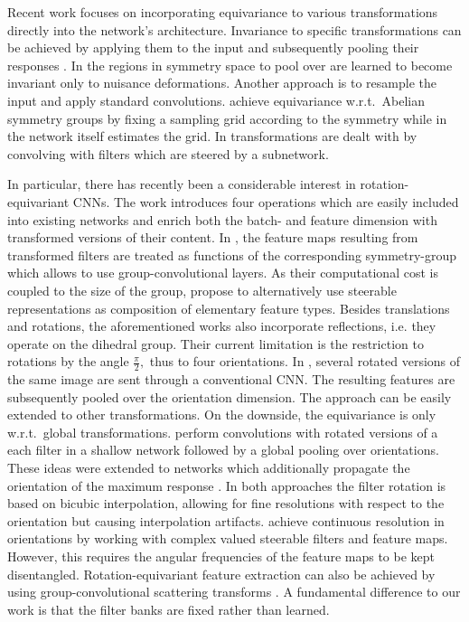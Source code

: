 \documentclass[10pt,twocolumn,letterpaper]{article}
\begin{document}
Recent work focuses on incorporating equivariance to various transformations directly into the network's architecture.
Invariance to specific transformations can be achieved by applying them to the input and subsequently pooling their responses \cite{ICML2012Sohn_659, DBLP:journals/corr/KanazawaSJ14, zhang2015discriminative}.
In \cite{NIPS2014_5424} the regions in symmetry space to pool over are learned to become invariant only to nuisance deformations.
Another approach is to resample the input and apply standard convolutions.
\citet{pmlr-v70-henriques17a} achieve equivariance w.r.t.~Abelian symmetry groups by fixing a sampling grid according to the symmetry while in \cite{DBLP:journals/corr/JaderbergSZK15,lin2016inverse} the network itself estimates the grid.
In \cite{jacobsen2017dynamic} transformations are dealt with by convolving with filters which are steered by a subnetwork.

In particular, there has recently been a considerable interest in rotation-equivariant \mbox{CNNs}.
The work \cite{dieleman2016exploiting} introduces four operations which are easily included into existing networks and enrich both the batch- and feature dimension with transformed versions of their content. 
In \cite{cohen2016group}, the feature maps resulting from transformed filters are treated as functions of the corresponding symmetry-group which allows to use group-convolutional layers.
As their computational cost is coupled to the size of the group, \citet{cohen2016steerable} propose to alternatively use steerable representations as composition of elementary feature types.
Besides translations and rotations, the aforementioned works also incorporate reflections, i.e. they operate on the dihedral group.
Their current limitation is the restriction to rotations by the angle $\frac{\pi}{2},$ thus to four orientations.
In \cite{laptev2016ti}, several rotated versions of the same image are sent through a conventional CNN. The resulting features are subsequently pooled over the orientation dimension.
The approach can be easily extended to other transformations.
On the downside, the equivariance is only w.r.t.~global transformations.
\citet{marcos2016learning} perform convolutions with rotated versions of a each filter in a shallow network followed by a global pooling over orientations.
These ideas were extended to networks which additionally propagate the orientation of the maximum response \cite{marcos2016rotation}.
In both approaches the filter rotation is based on bicubic interpolation, allowing for fine resolutions with respect to the orientation but causing interpolation artifacts.
\citet{worrall2016harmonic} achieve continuous resolution in orientations by working with complex valued steerable filters and feature maps.
However, this requires the angular frequencies of the feature maps to be kept disentangled. 
Rotation-equivariant feature extraction can also be achieved by using group-convolutional scattering transforms \cite{sifre2013rotation}.
A fundamental difference to our work is that the filter banks are fixed rather than learned.
\end{document}
